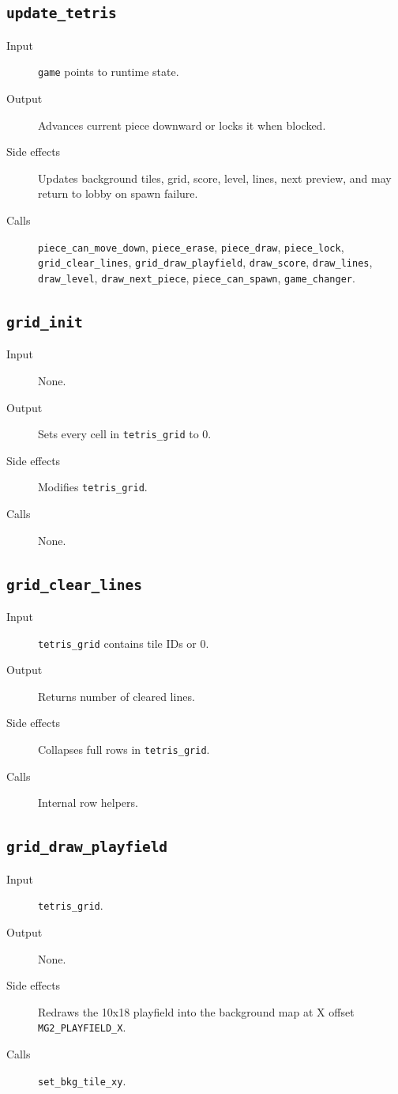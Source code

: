 \subsection*{\texttt{update\_tetris}}
\begin{description}
  \item[Input] \texttt{game} points to runtime state.
  \item[Output] Advances current piece downward or locks it when blocked.
  \item[Side effects] Updates background tiles, grid, score, level, lines, next preview, and may return to lobby on spawn failure.
  \item[Calls] \texttt{piece\_can\_move\_down}, \texttt{piece\_erase}, \texttt{piece\_draw}, \texttt{piece\_lock}, \texttt{grid\_clear\_lines}, \texttt{grid\_draw\_playfield}, \texttt{draw\_score}, \texttt{draw\_lines}, \texttt{draw\_level}, \texttt{draw\_next\_piece}, \texttt{piece\_can\_spawn}, \texttt{game\_changer}.
\end{description}

\subsection*{\texttt{grid\_init}}
\begin{description}
  \item[Input] None.
  \item[Output] Sets every cell in \texttt{tetris\_grid} to 0.
  \item[Side effects] Modifies \texttt{tetris\_grid}.
  \item[Calls] None.
\end{description}

\subsection*{\texttt{grid\_clear\_lines}}
\begin{description}
  \item[Input] \texttt{tetris\_grid} contains tile IDs or 0.
  \item[Output] Returns number of cleared lines.
  \item[Side effects] Collapses full rows in \texttt{tetris\_grid}.
  \item[Calls] Internal row helpers.
\end{description}

\subsection*{\texttt{grid\_draw\_playfield}}
\begin{description}
  \item[Input] \texttt{tetris\_grid}.
  \item[Output] None.
  \item[Side effects] Redraws the 10x18 playfield into the background map at X offset \texttt{MG2\_PLAYFIELD\_X}.
  \item[Calls] \texttt{set\_bkg\_tile\_xy}.
\end{description}

